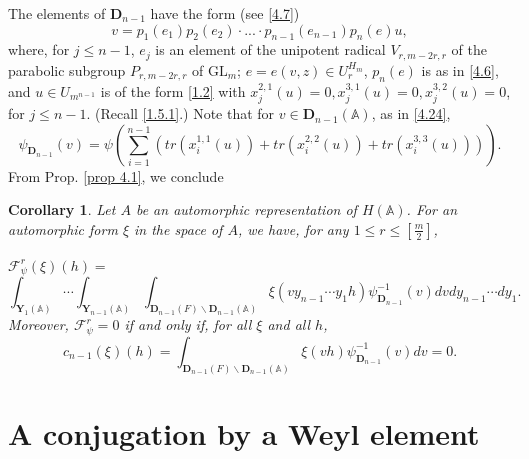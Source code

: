 \documentclass[12pts]{amsart}
\newcommand{\BA}{{\mathbb {A}}}
\newcommand{\GL}{{\mathrm{GL}}}
\newtheorem{cor}[thm]{Corollary}
\begin{document}
The elements of $\mathbf{D}_{n-1}$ have the form (see \eqref{4.7})
\begin{equation}\label{4.24}
v=p_1(e_1)p_2(e_2)\cdot...\cdot
p_{n-1}(e_{n-1})p_n(e)u,
\end{equation}
where, for $j\leq n-1$, $e_j$ is an element of the unipotent radical $V_{r,m-2r,r}$ of the parabolic subgroup $P_{r,m-2r,r}$ of $\GL_m$; $e=e(v,z)\in U_r^{H_m}$, $p_n(e)$ is as in \eqref{4.6}, and $u\in U_{m^{n-1}}$ is of the form \eqref{1.2} with $x_j^{2,1}(u)=0,
x_j^{3,1}(u)=0, x_j^{3,2}(u)=0$, for $j\leq n-1$. (Recall \eqref{1.5.1}.) Note that for $v\in
\mathbf{D}_{n-1}(\BA)$, as in \eqref{4.24},
\begin{equation}\label{4.25}
\psi_{\mathbf{D}_{n-1}}(v)=\psi(\sum_{i=1}^{n-1}(tr(x_i^{1,1}(u))+tr(x_i^{2,2}(u))+tr(x_i^{3,3}(u)))).
\end{equation}
From Prop. \ref{prop 4.1}, we conclude
\begin{cor}\label{cor 4.2}
	Let $A$ be an automorphic representation of $H(\BA)$. For an automorphic form $\xi$ in the space of $A$, we have, for any $1\leq r\leq [\frac{m}{2}]$,\\
	\\
	$\mathcal{F}_\psi^r(\xi)(h)=$
    $$
	\int_{\mathbf{Y}_1(\BA)}\cdots \int_{\mathbf{Y}_{n-1}(\BA)}\int_{\mathbf{D}_{n-1}(F)\backslash \mathbf{D}_{n-1}(\BA)}\xi(vy_{n-1}\cdots y_1h)\psi_{\mathbf{D}_{n-1}}^{-1}(v)dvdy_{n-1}\cdots dy_1.
	$$
Moreover, $\mathcal{F}_\psi^r=0$ if and
	only if, for all $\xi$ and all $h$, 
	\begin{equation}\label{4.26}
	c_{n-1}(\xi)(h)=\int_{\mathbf{D}_{n-1}(F)\backslash \mathbf{D}_{n-1}(\BA)}\xi(vh)\psi_{\mathbf{D}_{n-1}}^{-1}(v)dv=0.
	\end{equation}
\end{cor}


\section{ A conjugation by a Weyl element}
\end{document}
